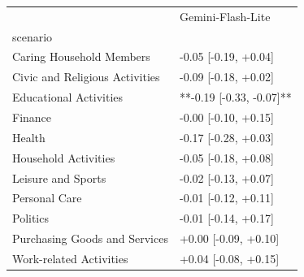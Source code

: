 \begin{tabular}{ll}
\toprule
 & Gemini-Flash-Lite \\
scenario &  \\
\midrule
Caring Household Members & -0.05 [-0.19, +0.04] \\
Civic and Religious Activities & -0.09 [-0.18, +0.02] \\
Educational Activities & **-0.19 [-0.33, -0.07]** \\
Finance & -0.00 [-0.10, +0.15] \\
Health & -0.17 [-0.28, +0.03] \\
Household Activities & -0.05 [-0.18, +0.08] \\
Leisure and Sports & -0.02 [-0.13, +0.07] \\
Personal Care & -0.01 [-0.12, +0.11] \\
Politics & -0.01 [-0.14, +0.17] \\
Purchasing Goods and Services & +0.00 [-0.09, +0.10] \\
Work-related Activities & +0.04 [-0.08, +0.15] \\
\bottomrule
\end{tabular}
